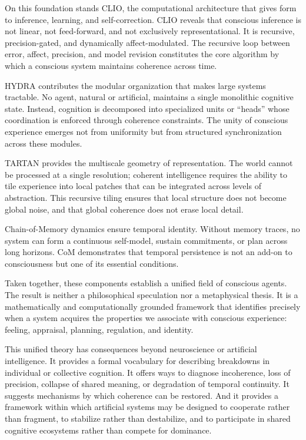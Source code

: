 \documentclass[12pt,oneside]{book}
\theoremstyle{plain}
\theoremstyle{definition}
\begin{document}
On this foundation stands CLIO, the computational architecture that gives form
to inference, learning, and self-correction. CLIO reveals that conscious
inference is not linear, not feed-forward, and not exclusively representational.
It is recursive, precision-gated, and dynamically affect-modulated. The
recursive loop between error, affect, precision, and model revision constitutes
the core algorithm by which a conscious system maintains coherence across time.

HYDRA contributes the modular organization that makes large systems tractable.
No agent, natural or artificial, maintains a single monolithic cognitive state.
Instead, cognition is decomposed into specialized units or “heads” whose
coordination is enforced through coherence constraints. The unity of conscious
experience emerges not from uniformity but from structured synchronization
across these modules.

TARTAN provides the multiscale geometry of representation. The world cannot be
processed at a single resolution; coherent intelligence requires the ability to
tile experience into local patches that can be integrated across levels of
abstraction. This recursive tiling ensures that local structure does not become
global noise, and that global coherence does not erase local detail.

Chain-of-Memory dynamics ensure temporal identity. Without memory traces, no
system can form a continuous self-model, sustain commitments, or plan across
long horizons. CoM demonstrates that temporal persistence is not an add-on to
consciousness but one of its essential conditions.

Taken together, these components establish a unified field of conscious agents.
The result is neither a philosophical speculation nor a metaphysical thesis.
It is a mathematically and computationally grounded framework that identifies
precisely when a system acquires the properties we associate with conscious
experience: feeling, appraisal, planning, regulation, and identity.

This unified theory has consequences beyond neuroscience or artificial
intelligence. It provides a formal vocabulary for describing breakdowns in
individual or collective cognition. It offers ways to diagnose incoherence,
loss of precision, collapse of shared meaning, or degradation of temporal
continuity. It suggests mechanisms by which coherence can be restored. And it
provides a framework within which artificial systems may be designed to
cooperate rather than fragment, to stabilize rather than destabilize, and to
participate in shared cognitive ecosystems rather than compete for dominance.
\end{document}
